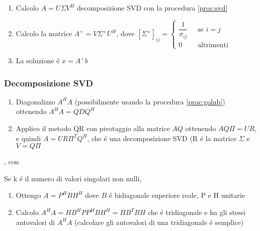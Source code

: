 \subsection{}
\begin{proc}\label{proc:svdminquadlin}
\begin{enumerate}
\item Calcolo $ A = U \Sigma V^H $ decomposizione SVD con la procedura \ref{proc:svd}
\item Calcolo la matrice $ A^+ = V \Sigma^+ U^H $, dove $ \left[ \Sigma^+ \right]_{ij} = \left\lbrace \begin{array}{ll}
\dfrac{1}{\sigma_{ij}} & \;\text{ se } i = j \\
0 & \; \text{ altrimenti}
\end{array} \right. $
\item La soluzione \'e $ x = A^+ b $
\end{enumerate}
\end{proc}

\subsubsection{Decomposizione SVD}
\begin{proc}\label{proc:svd}
\begin{enumerate}
\item Diagonalizzo $ A^H A $ (possibilmente usando la procedura \ref{proc:golub}) ottenendo $ A^H A = Q D Q^H $
\item Applico il metodo QR con pivotaggio alla matrice $ AQ $ ottenendo $ A Q \Pi = U R $, e quindi $ A = U R \Pi^T Q^H $, che \'e una decomposizione SVD (R \'e la matrice $ \Sigma $ e $ V = Q \Pi $
\end{enumerate}
\end{proc}

\askip

, con 

\askip

Se k \'e il numero di valori singolari non nulli, 

\askip

\begin{proc}\label{proc:golub}
\begin{enumerate}
\item Ottengo $ A = P^H B H^H $ dove $ B $ \'e bidiagonale superiore reale, P e H unitarie
\item Calcolo $ A^H A = H B^H P P^H B H^H = H B^T B H $ che \'e tridiagonale e ha gli stessi autovalori di $ A^H A $ (calcolare gli autovalori di una tridiagonale \'e semplice)
\end{enumerate}
\end{proc}

